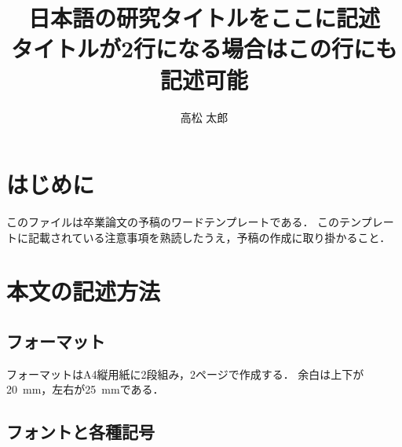 \documentclass[a4j]{jsarticle}
\title{日本語の研究タイトルをここに記述\\タイトルが2行になる場合はこの行にも記述可能}
\author{高松 太郎}
\begin{document}
\maketitle%



\thispagestyle{empty}
\pagestyle{empty}

\section{はじめに}

このファイルは卒業論文の予稿のワードテンプレートである．
このテンプレートに記載されている注意事項を熟読したうえ，予稿の作成に取り掛かること．

\section{本文の記述方法}

\subsection{フォーマット}

フォーマットはA4縦用紙に2段組み，2ページで作成する．
余白は上下が20~mm，左右が25~mmである．

\subsection{フォントと各種記号}
\end{document}
